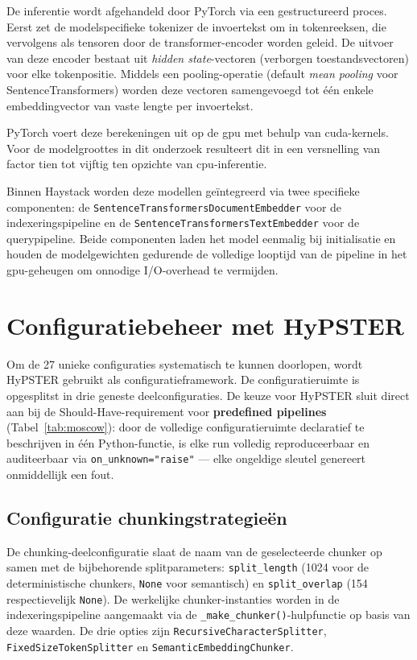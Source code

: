 De inferentie wordt afgehandeld door PyTorch via een gestructureerd proces. Eerst zet de modelspecifieke tokenizer de invoertekst om in tokenreeksen, die vervolgens als tensoren door de transformer-encoder worden geleid. De uitvoer van deze encoder bestaat uit \emph{hidden state}-vectoren (verborgen toestandsvectoren) voor elke tokenpositie. Middels een pooling-operatie (default \emph{mean pooling} voor SentenceTransformers) worden deze vectoren samengevoegd tot één enkele embeddingvector van vaste lengte per invoertekst. 

PyTorch voert deze berekeningen uit op de \gls{gpu} met behulp van \gls{cuda}-kernels. Voor de modelgroottes in dit onderzoek resulteert dit in een versnelling van factor tien tot vijftig ten opzichte van \gls{cpu}-inferentie.

Binnen Haystack worden deze modellen geïntegreerd via twee specifieke componenten: de \texttt{SentenceTransformersDocumentEmbedder} voor de indexeringspipeline en de \texttt{SentenceTransformersTextEmbedder} voor de querypipeline. Beide componenten laden het model eenmalig bij initialisatie en houden de modelgewichten gedurende de volledige looptijd van de pipeline in het \gls{gpu}-geheugen om onnodige I/O-overhead te vermijden.

\section{Configuratiebeheer met HyPSTER}
\label{sec:hypster-config}

Om de 27 unieke configuraties systematisch te kunnen doorlopen, wordt HyPSTER gebruikt als configuratieframework. De configuratieruimte is opgesplitst in drie geneste deelconfiguraties. De keuze voor HyPSTER sluit direct aan bij de Should-Have-requirement voor \textbf{predefined pipelines} (Tabel~\ref{tab:moscow}): door de volledige configuratieruimte declaratief te beschrijven in één Python-functie, is elke run volledig reproduceerbaar en auditeerbaar via \texttt{on\_unknown="raise"} — elke ongeldige sleutel genereert onmiddellijk een fout.

\subsection{Configuratie chunkingstrategieën}

De chunking-deelconfiguratie slaat de naam van de geselecteerde chunker op samen met de bijbehorende splitparameters: \texttt{split\_length} (1024 voor de deterministische chunkers, \texttt{None} voor semantisch) en \texttt{split\_overlap} (154 respectievelijk \texttt{None}). De werkelijke chunker-instanties worden in de indexeringspipeline aangemaakt via de \texttt{\_make\_chunker()}-hulpfunctie op basis van deze waarden. De drie opties zijn \texttt{RecursiveCharacterSplitter}, \texttt{FixedSizeTokenSplitter} en \texttt{SemanticEmbeddingChunker}.


